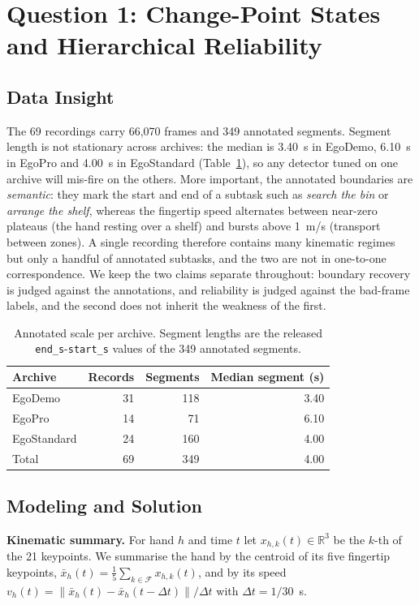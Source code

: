 \documentclass{swmcmthesis}
\begin{document}
\section{Question 1: Change-Point States and Hierarchical Reliability}\label{sec:q1}
\subsection{Data Insight}
The 69 recordings carry 66,070 frames and 349 annotated segments. Segment length is not stationary across archives: the median is 3.40~s in EgoDemo, 6.10~s in EgoPro and 4.00~s in EgoStandard (Table~\ref{tab:p1scale}), so any detector tuned on one archive will mis-fire on the others. More important, the annotated boundaries are \emph{semantic}: they mark the start and end of a subtask such as \emph{search the bin} or \emph{arrange the shelf}, whereas the fingertip speed alternates between near-zero plateaus (the hand resting over a shelf) and bursts above 1~m/s (transport between zones). A single recording therefore contains many kinematic regimes but only a handful of annotated subtasks, and the two are not in one-to-one correspondence. We keep the two claims separate throughout: boundary recovery is judged against the annotations, and reliability is judged against the bad-frame labels, and the second does not inherit the weakness of the first.

\begin{table}[tbp]\centering\footnotesize
\caption{Annotated scale per archive. Segment lengths are the released \texttt{end\_s}-\texttt{start\_s} values of the 349 annotated segments.}\label{tab:p1scale}
\begin{tabular}{lrrr}
\toprule
Archive & Records & Segments & Median segment (s) \\
\midrule
EgoDemo & 31 & 118 & 3.40 \\
EgoPro & 14 & 71 & 6.10 \\
EgoStandard & 24 & 160 & 4.00 \\
\midrule
Total & 69 & 349 & 4.00 \\
\bottomrule
\end{tabular}
\end{table}
\subsection{Modeling and Solution}
\textbf{Kinematic summary.} For hand $h$ and time $t$ let $x_{h,k}(t)\in\mathbb{R}^3$ be the $k$-th of the 21 keypoints. We summarise the hand by the centroid of its five fingertip keypoints, $\bar x_h(t)=\frac15\sum_{k\in\mathcal{F}}x_{h,k}(t)$, and by its speed $v_h(t)=\|\bar x_h(t)-\bar x_h(t-\Delta t)\|/\Delta t$ with $\Delta t=1/30$~s.
\end{document}

